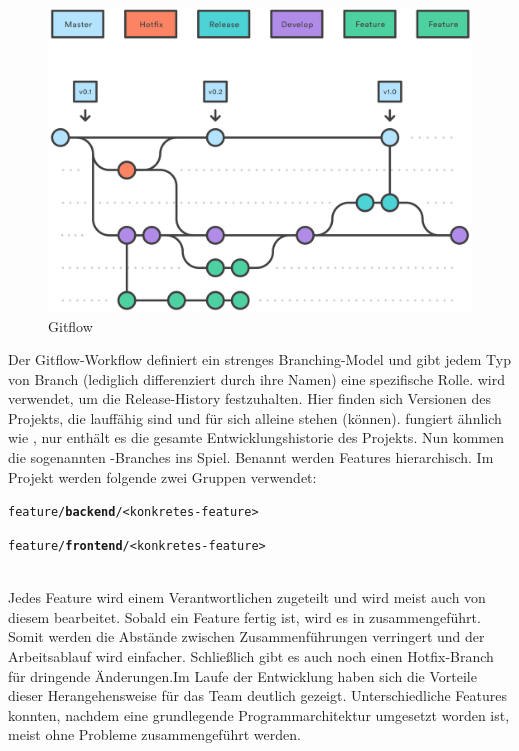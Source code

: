 \begin{figure}[h]
	\includegraphics[width=\columnwidth]{img/gitflow}
	\caption[Gitflow]{Gitflow\footnotemark}
\end{figure}

Der Gitflow-Workflow definiert ein strenges Branching-Model und gibt jedem Typ von Branch (lediglich differenziert durch ihre Namen) eine spezifische Rolle.  wird verwendet, um die Release-History festzuhalten. Hier finden sich Versionen des Projekts, die lauffähig sind und für sich alleine stehen (können).  fungiert ähnlich wie , nur enthält es die gesamte Entwicklungshistorie des Projekts. Nun kommen die sogenannten -Branches ins Spiel. Benannt werden Features hierarchisch. Im Projekt werden folgende zwei Gruppen verwendet:
 
\vspace{0.5em}
\begin{minipage}{\textwidth}
	\texttt{feature/\textbf{backend}/<konkretes-feature>}
	
	\texttt{feature/\textbf{frontend}/<konkretes-feature>}
\end{minipage}
\vspace{0.5em}
\\
Jedes Feature wird einem Verantwortlichen zugeteilt und wird meist auch von diesem bearbeitet. Sobald ein Feature fertig ist, wird es in  zusammengeführt. Somit werden die Abstände zwischen Zusammenführungen verringert und der Arbeitsablauf wird einfacher. Schließlich gibt es auch noch einen Hotfix-Branch für dringende Änderungen.Im Laufe der Entwicklung haben sich die Vorteile dieser Herangehensweise für das Team deutlich gezeigt. Unterschiedliche Features konnten, nachdem eine grundlegende Programmarchitektur umgesetzt worden ist, meist ohne Probleme zusammengeführt werden. 

